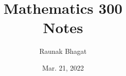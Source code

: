 \documentclass{article}
\newcommand{\myname}{Raunak Bhagat}
\begin{document}
\title{Mathematics 300\\Notes}
\author{\myname}
\date{Mar. 21, 2022}
\maketitle

\newpage

\end{document}
